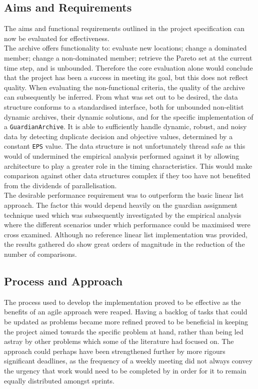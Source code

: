 \documentclass{ecmm427_assignment}
\begin{document}
\subsection{Aims and Requirements}
The aims and functional requirements outlined in the project specification can now be evaluated for effectiveness.\\
The archive offers functionality to: evaluate new locations; change a dominated member; change a non-dominated member; retrieve the Pareto set at the current time step, and is unbounded. Therefore the core evaluation alone would conclude that the project has been a success in meeting its goal, but this does not reflect quality.
When evaluating the non-functional criteria, the quality of the archive can subsequently be inferred. From what was set out to be desired, the data structure conforms to a standardised interface, both for unbounded non-elitist dynamic archives, their dynamic solutions, and for the specific implementation of a \texttt{GuardianArchive}. It is able to sufficiently handle dynamic, robust, and noisy data by detecting duplicate decision and objective values, determined by a constant \texttt{EPS} value. The data structure is not unfortunately thread safe as this would of undermined the empirical analysis performed against it by allowing architecture to play a greater role in the timing characteristics. This would make comparison against other data structures complex if they too have not benefited from the dividends of parallelisation.\\ 
The desirable performance requirement was to outperform the basic linear list approach. The factor this would depend heavily on the guardian assignment technique used which was subsequently investigated by the empirical analysis where the different scenarios under which performance could be maximised were cross examined. Although no reference linear list implementation was provided, the results gathered do show great orders of magnitude in the reduction of the number of comparisons.

\subsection{Process and Approach}
The process used to develop the implementation proved to be effective as the benefits of an agile approach were reaped. Having a backlog of tasks that could be updated as problems became more refined proved to be beneficial in keeping the project aimed towards the specific problem at hand, rather than being led astray by other problems which some of the literature had focused on. The approach could perhaps have been strengthened further by more rigours significant deadlines, as the frequency of a weekly meeting did not always convey the urgency that work would need to be completed by in order for it to remain equally distributed amongst sprints.
\end{document}
